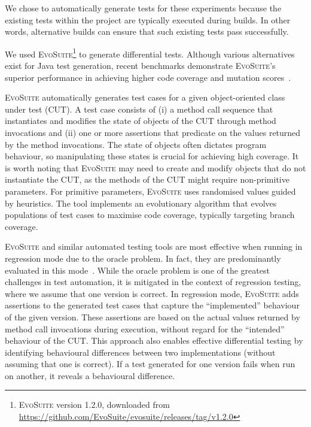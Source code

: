 \documentclass[conference]{IEEEtran}
\makeatletter
\newcommand{\evosuite}{\textsc{EvoSuite}\@\xspace}
\newcommand{\valerio}[1]{\textbf{\textcolor{blue}{[ \ding{46}Valerio: #1]}}}
\makeatother
\begin{document}
We chose to automatically generate tests for these experiments because the existing tests within the project are typically executed during builds. In other words, alternative builds can ensure that such existing tests pass successfully.

We used \evosuite\footnote{\evosuite version 1.2.0, downloaded from \url{https://github.com/EvoSuite/evosuite/releases/tag/v1.2.0}}
to generate differential tests. Although various alternatives exist for Java test generation, recent benchmarks demonstrate \evosuite's superior performance in achieving higher code coverage and mutation scores~\cite{jahangirova2023sbft}.

\evosuite automatically generates test cases for a given object-oriented class under test (CUT). A test case consists of (i) a method call sequence that instantiates and modifies the state of objects of the CUT through method invocations and (ii) one or more assertions that predicate on the values returned by the method invocations. The state of objects often dictates program behaviour, so manipulating these states is crucial for achieving high coverage. It is worth noting that \evosuite may need to create and modify objects that do not instantiate the CUT, as the methods of the CUT might require non-primitive parameters. For primitive parameters, \evosuite uses randomised values guided by heuristics. The tool implements an evolutionary algorithm that evolves populations of test cases to maximise code coverage, typically targeting branch coverage.

\evosuite and similar automated testing tools are most effective when running in regression mode due to the oracle problem. In fact, they are predominantly evaluated in this mode~\cite{jahangirova2023sbft,shamshiri2015automatically}. While the oracle problem is one of the greatest challenges in test automation, it is mitigated in the context of regression testing, where we assume that one version is correct. In regression mode, \evosuite adds assertions to the generated test cases that capture the ``implemented'' behaviour of the given version. These assertions are based on the actual values returned by method call invocations during execution, without regard for the ``intended'' behaviour of the CUT. This approach also enables effective differential testing by identifying behavioural differences between two implementations (without assuming that one is correct). If a test generated for one version fails when run on another, it reveals a behavioural difference. %
\end{document}
